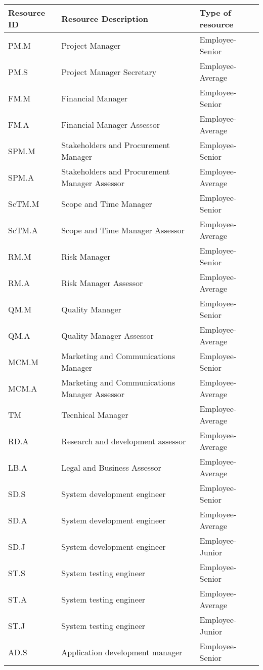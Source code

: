 \begin{longtable}[H]{l l l}
		
	\toprule[2pt]
	
	\textbf{Resource ID} & \textbf{Resource Description} & \textbf{Type of resource} \\
	
	\midrule[1.5pt] 
	\endhead
		
	PM.M&Project Manager&Employee-Senior\\
	PM.S&Project Manager Secretary&Employee-Average\\
	FM.M&Financial Manager&Employee-Senior\\
	FM.A&Financial Manager Assessor&Employee-Average\\
	SPM.M&Stakeholders and Procurement Manager&Employee-Senior\\
	SPM.A&Stakeholders and Procurement Manager Assessor&Employee-Average\\
	ScTM.M&Scope and Time Manager&Employee-Senior\\
	ScTM.A&Scope and Time Manager Assessor&Employee-Average\\
	RM.M&Risk Manager&Employee-Senior\\
	RM.A&Risk Manager Assessor&Employee-Average\\
	QM.M&Quality Manager&Employee-Senior\\
	QM.A&Quality Manager Assessor&Employee-Average\\
	MCM.M&Marketing and Communications Manager&Employee-Senior\\
	MCM.A&Marketing and Communications Manager Assessor&Employee-Average\\
	TM&Tecnhical Manager&Employee-Average\\
	RD.A&Research and development assessor&Employee-Average\\
	LB.A&Legal and Business Assessor&Employee-Average\\
	SD.S&System development engineer&Employee-Senior\\
	SD.A&System development engineer&Employee-Average\\
	SD.J&System development engineer&Employee-Junior\\
	ST.S&System testing engineer&Employee-Senior\\
	ST.A&System testing engineer&Employee-Average\\
	ST.J&System testing engineer&Employee-Junior\\
	AD.S&Application development manager&Employee-Senior\\

\end{longtable}
